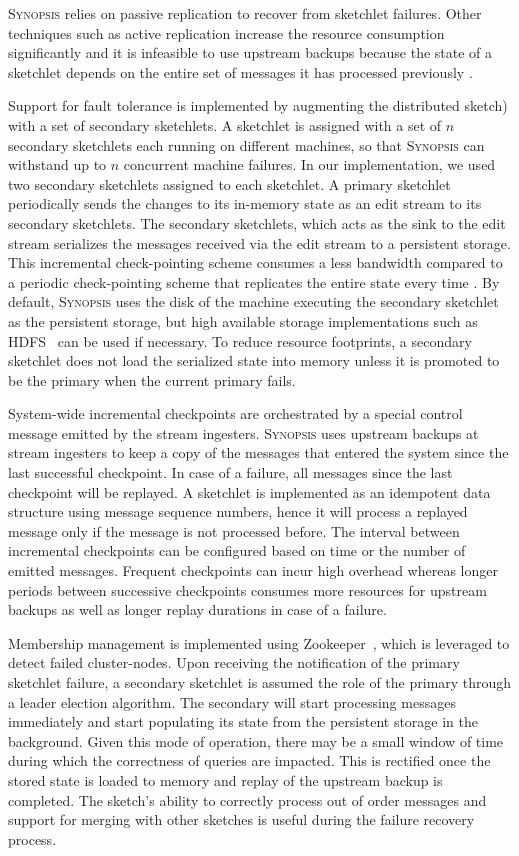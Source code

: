 \textsc{Synopsis} relies on passive replication to recover from sketchlet failures.
Other techniques such as active replication increase the resource consumption significantly and it is infeasible to use upstream backups because the state of a sketchlet depends on the entire set of messages it has processed previously \cite{castro2013integrating}.

Support for fault tolerance is implemented by augmenting the distributed sketch) with a set of secondary sketchlets.
A sketchlet is assigned with a set of $n$ secondary sketchlets each running on different machines, so that \textsc{Synopsis} can withstand up to $n$ concurrent machine failures.
In our implementation, we used two secondary sketchlets assigned to each sketchlet.
A primary sketchlet periodically sends the changes to its in-memory state as an edit stream to its secondary sketchlets.
The secondary sketchlets, which acts as the sink to the edit stream serializes the messages received via the edit stream to a persistent storage.
This incremental check-pointing scheme consumes a less bandwidth compared to a periodic check-pointing scheme that replicates the entire state every time \cite{castro2013integrating}.
By default, \textsc{Synopsis} uses the disk of the machine executing the secondary sketchlet as the persistent storage, but high available storage implementations such as HDFS~\cite{borthakur2008hdfs} can be used if necessary.
To reduce resource footprints, a secondary sketchlet does not load the serialized state into memory unless it is promoted to be the primary when the current primary fails.

System-wide incremental checkpoints are orchestrated by a special control message emitted by the stream ingesters.
\textsc{Synopsis} uses upstream backups at stream ingesters to keep a copy of the messages that entered the system since the last successful checkpoint.
In case of a failure, all messages since the last checkpoint will be replayed.
A sketchlet is implemented as an idempotent data structure using message sequence numbers, hence it will process a replayed message only if the message is not processed before.
The interval between incremental checkpoints can be configured based on time or the number of emitted messages.
Frequent checkpoints can incur high overhead whereas longer periods between successive checkpoints consumes more resources for upstream backups as well as longer replay durations in case of a failure.

Membership management is implemented using Zookeeper~\cite{hunt2010zookeeper}, which is leveraged to detect failed cluster-nodes.
Upon receiving the notification of the primary sketchlet failure, a secondary sketchlet is assumed the role of the primary through a leader election algorithm.
The secondary will start processing messages immediately and start populating its state from the persistent storage in the background.
Given this mode of operation, there may be a small window of time during which the correctness of queries are impacted.
This is rectified once the stored state is loaded to memory and replay of the upstream backup is completed.
The sketch's ability to correctly process out of order messages and support for merging with other sketches is useful during the failure recovery process.

